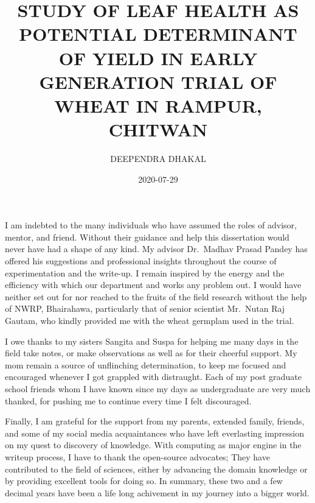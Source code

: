 \documentclass[12pt,oneside]{dukestatscithesis} %
\title{STUDY OF LEAF HEALTH AS POTENTIAL DETERMINANT OF YIELD IN EARLY GENERATION TRIAL OF WHEAT IN RAMPUR, CHITWAN}
\author{DEEPENDRA DHAKAL}
\date{2020-07-29}
\begin{document}
% 
\setlength{\baselineskip}{1.5\baselineskip}


\frontmatter %
\pagestyle{empty} %
  \begin{acknowledgements}
    \setlength{\baselineskip}{1.5\baselineskip}

    I am indebted to the many individuals who have assumed the roles of advisor, mentor, and friend. Without their guidance and help this dissertation would never have had a shape of any kind. My advisor Dr.~Madhav Prasad Pandey has offered his suggestions and professional insights throughout the course of experimentation and the write-up. I remain inspired by the energy and the efficiency with which our department and works any problem out. I would have neither set out for nor reached to the fruits of the field research without the help of NWRP, Bhairahawa, particularly that of senior scientist Mr.~Nutan Raj Gautam, who kindly provided me with the wheat germplam used in the trial.

    \par

    I owe thanks to my sisters Sangita and Suspa for helping me many days in the field take notes, or make observations as well as for their cheerful support. My mom remain a source of unflinching determination, to keep me focused and encouraged whenever I got grappled with distraught. Each of my post graduate school friends whom I have known since my days as undergraduate are very much thanked, for pushing me to continue every time I felt discouraged.

    \par

    Finally, I am grateful for the support from my parents, extended family, friends, and some of my social media acquaintances who have left everlasting impression on my quest to discovery of knowledge. With computing as major engine in the writeup process, I have to thank the open-source advocates; They have contributed to the field of sciences, either by advancing the domain knowledge or by providing excellent tools for doing so. In summary, these two and a few decimal years have been a life long achivement in my journey into a bigger world.
  \end{acknowledgements}
\end{document}

